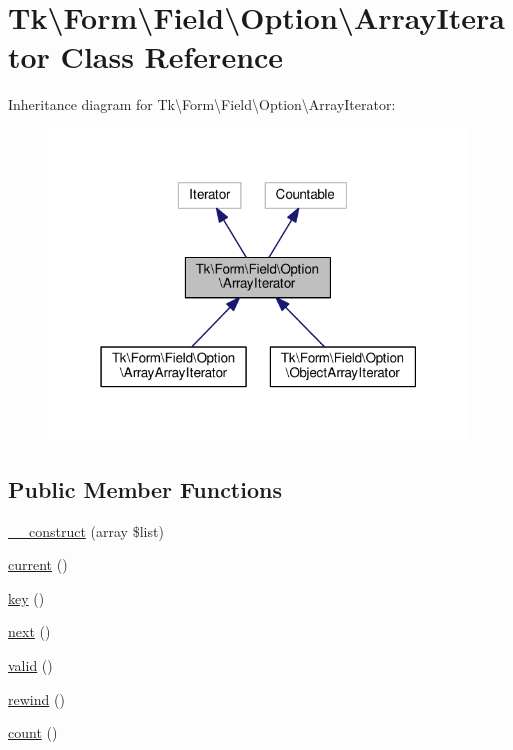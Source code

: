\hypertarget{classTk_1_1Form_1_1Field_1_1Option_1_1ArrayIterator}{\section{Tk\textbackslash{}Form\textbackslash{}Field\textbackslash{}Option\textbackslash{}Array\+Iterator Class Reference}
\label{classTk_1_1Form_1_1Field_1_1Option_1_1ArrayIterator}
}


Inheritance diagram for Tk\textbackslash{}Form\textbackslash{}Field\textbackslash{}Option\textbackslash{}Array\+Iterator\+:\nopagebreak
\begin{figure}[H]
\begin{center}
\leavevmode
\includegraphics[width=316pt]{classTk_1_1Form_1_1Field_1_1Option_1_1ArrayIterator__inherit__graph}
\end{center}
\end{figure}
\subsection*{Public Member Functions}
\begin{DoxyCompactItemize}
\item 
\hyperlink{classTk_1_1Form_1_1Field_1_1Option_1_1ArrayIterator_ac4fdd09eecbc05317db2dc0131c2016c}{\+\_\+\+\_\+construct} (array \$list)
\item 
\hyperlink{classTk_1_1Form_1_1Field_1_1Option_1_1ArrayIterator_a3209d9d1c8893229fba7239836c4dc9b}{current} ()
\item 
\hyperlink{classTk_1_1Form_1_1Field_1_1Option_1_1ArrayIterator_a51f470ada09d9085a7d9e20aabca27a2}{key} ()
\item 
\hyperlink{classTk_1_1Form_1_1Field_1_1Option_1_1ArrayIterator_a024f4290ec2de05331b6decf20abebb2}{next} ()
\item 
\hyperlink{classTk_1_1Form_1_1Field_1_1Option_1_1ArrayIterator_a2398de5dd7c52d4510490a6e076f6f23}{valid} ()
\item 
\hyperlink{classTk_1_1Form_1_1Field_1_1Option_1_1ArrayIterator_af8194e9aec780f4a0835e40a35c4f9f7}{rewind} ()
\item 
\hyperlink{classTk_1_1Form_1_1Field_1_1Option_1_1ArrayIterator_a111de27b649638fd451454a9ff7ae9b0}{count} ()
\end{DoxyCompactItemize}

